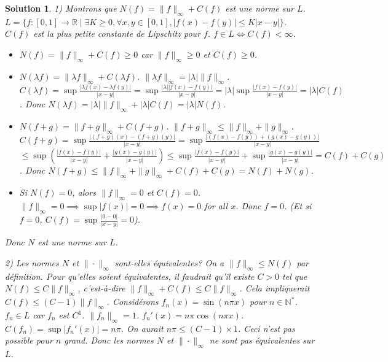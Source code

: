 \documentclass{article}
\newtheorem{solution}{Solution}
\begin{document}
\begin{solution}
1) Montrons que $N(f) = \|f\|_\infty + C(f)$ est une norme sur $L$.
$L = \{ f: [0,1] \to \mathbb{R} \mid \exists K \ge 0, \forall x, y \in [0,1], |f(x)-f(y)| \le K |x-y| \}$.
$C(f)$ est la plus petite constante de Lipschitz pour $f$. $f \in L \iff C(f) < \infty$.
\begin{itemize}
    \item $N(f) = \|f\|_\infty + C(f) \ge 0$ car $\|f\|_\infty \ge 0$ et $C(f) \ge 0$.
    \item $N(\lambda f) = \|\lambda f\|_\infty + C(\lambda f)$. $\|\lambda f\|_\infty = |\lambda| \|f\|_\infty$.
    $C(\lambda f) = \sup \frac{|\lambda f(x) - \lambda f(y)|}{|x-y|} = \sup \frac{|\lambda| |f(x)-f(y)|}{|x-y|} = |\lambda| \sup \frac{|f(x)-f(y)|}{|x-y|} = |\lambda| C(f)$.
    Donc $N(\lambda f) = |\lambda| \|f\|_\infty + |\lambda| C(f) = |\lambda| N(f)$.
    \item $N(f+g) = \|f+g\|_\infty + C(f+g)$. $\|f+g\|_\infty \le \|f\|_\infty + \|g\|_\infty$.
    $C(f+g) = \sup \frac{|(f+g)(x) - (f+g)(y)|}{|x-y|} = \sup \frac{|(f(x)-f(y)) + (g(x)-g(y))|}{|x-y|}$
    $\le \sup (\frac{|f(x)-f(y)|}{|x-y|} + \frac{|g(x)-g(y)|}{|x-y|}) \le \sup \frac{|f(x)-f(y)|}{|x-y|} + \sup \frac{|g(x)-g(y)|}{|x-y|} = C(f)+C(g)$.
    Donc $N(f+g) \le \|f\|_\infty + \|g\|_\infty + C(f) + C(g) = N(f) + N(g)$.
    \item Si $N(f) = 0$, alors $\|f\|_\infty = 0$ et $C(f) = 0$.
    $\|f\|_\infty = 0 \implies \sup |f(x)| = 0 \implies f(x) = 0$ for all $x$. Donc $f = 0$.
    (Et si $f=0$, $C(f) = \sup \frac{|0-0|}{|x-y|} = 0$).
\end{itemize}
Donc $N$ est une norme sur $L$.

2) Les normes $N$ et $\| \cdot \|_\infty$ sont-elles équivalentes?
On a $\|f\|_\infty \le N(f)$ par définition.
Pour qu'elles soient équivalentes, il faudrait qu'il existe $C > 0$ tel que $N(f) \le C \|f\|_\infty$, c'est-à-dire $\|f\|_\infty + C(f) \le C \|f\|_\infty$.
Cela impliquerait $C(f) \le (C-1) \|f\|_\infty$.
Considérons $f_n(x) = \sin(n \pi x)$ pour $n \in \mathbb{N}^*$.
$f_n \in L$ car $f_n$ est $C^1$. $\|f_n\|_\infty = 1$.
$f_n'(x) = n \pi \cos(n \pi x)$. $C(f_n) = \sup |f_n'(x)| = n \pi$.
On aurait $n \pi \le (C-1) \times 1$. Ceci n'est pas possible pour $n$ grand.
Donc les normes $N$ et $\| \cdot \|_\infty$ ne sont pas équivalentes sur $L$.


\end{solution}
\end{document}
